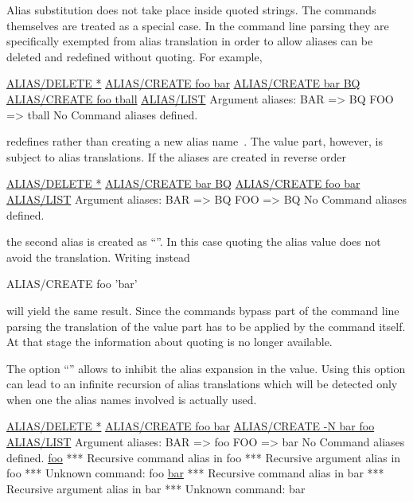 Alias substitution does not take place inside quoted strings.
The  commands themselves are treated as a special case.
In the command line parsing they are specifically exempted from alias
translation in order to allow aliases can be deleted and redefined
without quoting.
For example,
\begin{XMP}
\PROMPT{} \underline{ALIAS/DELETE *}
\PROMPT{} \underline{ALIAS/CREATE foo bar}
\PROMPT{} \underline{ALIAS/CREATE bar BQ}
\PROMPT{} \underline{ALIAS/CREATE foo tball}
\PROMPT{} \underline{ALIAS/LIST}
 Argument aliases:
 BAR        => BQ
 FOO        => tball
 No Command aliases defined.
\end{XMP}
redefines  rather than creating a new alias name~.
The value part, however, is subject to alias translations.
If the aliases are created in reverse order
\begin{XMP}
\PROMPT{} \underline{ALIAS/DELETE *}
\PROMPT{} \underline{ALIAS/CREATE bar BQ}
\PROMPT{} \underline{ALIAS/CREATE foo bar}
\PROMPT{} \underline{ALIAS/LIST}
 Argument aliases:
 BAR        => BQ
 FOO        => BQ
 No Command aliases defined.
\end{XMP}
the second alias is created as ``''.
In this case quoting the alias value does not avoid the translation.
Writing instead
\begin{XMP}
ALIAS/CREATE foo 'bar'
\end{XMP}
will yield the same result.
Since the  commands bypass part of the command line parsing
the translation of the value part has to be applied by the
 command itself.
At that stage the information about quoting is no longer available. 

The option ``'' allows to inhibit the alias expansion in the
value.
Using this option can lead to an infinite recursion of alias
translations which will be detected only when one the alias
names involved is actually used.
\begin{XMP}
\PROMPT{} \underline{ALIAS/DELETE *}
\PROMPT{} \underline{ALIAS/CREATE foo bar}
\PROMPT{} \underline{ALIAS/CREATE -N bar foo}
\PROMPT{} \underline{ALIAS/LIST}
 Argument aliases:
 BAR        => foo
 FOO        => bar
 No Command aliases defined.
\PROMPT{} \underline{foo}
 *** Recursive command alias in foo
 *** Recursive argument alias in foo
 *** Unknown command: foo
\PROMPT{} \underline{bar}
 *** Recursive command alias in bar
 *** Recursive argument alias in bar
 *** Unknown command: bar
\end{XMP}

